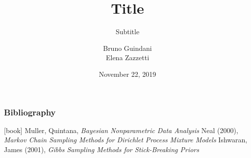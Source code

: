 \documentclass{beamer}
\title[Short title]{Title}
\subtitle{Subtitle}
\author[Guindani, Zazzetti]{Bruno Guindani \\ Elena Zazzetti}
\institute[PoliMi]{\texttt{[image: ../etc/logo\_long.jpg]}}
\date[2019/11/22]{November 22, 2019}
\begin{document}





\begin{frame} %
	\frametitle{Bibliography}
	\begin{thebibliography}{9}
		 Muller, Quintana, \textit{Bayesian Nonparametric Data Analysis}
		 Neal (2000), \textit{Markov Chain Sampling Methods for Dirichlet Process Mixture Models}
		 Ishwaran, James (2001), \textit{Gibbs Sampling Methods for Stick-Breaking Priors}	
	\end{thebibliography}
\end{frame}
\end{document}
